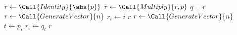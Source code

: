 \State $r\gets\Call{Identity}{\abs{p}}$
\State $r\gets\Call{Multiply}{r,p}$
\EndFor
\State \Return $q=r$
\EndFunction
{}
\State $r\gets\Call{GenerateVector}{n}$
\State $r_i\gets i$
\EndFor
\State \Return $r$
\EndFunction
{}
\State $r\gets\Call{GenerateVector}{n}$
\State $t\gets p_i$
\State $r_i\gets q_t$
\EndFor
\State \Return $r$
\EndFunction